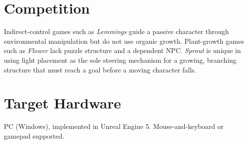 \documentclass[11pt, letterpaper]{article}
\begin{document}
\section*{Competition}

Indirect-control games such as \textit{Lemmings} guide a passive character through environmental
manipulation but do not use organic growth. Plant-growth games such as \textit{Flower} lack puzzle
structure and a dependent NPC. \textit{Sprout} is unique in using light placement as the sole
steering mechanism for a growing, branching structure that must reach a goal before a moving
character falls.

\section*{Target Hardware}

PC (Windows), implemented in Unreal Engine 5. Mouse-and-keyboard or gamepad supported.
\end{document}
